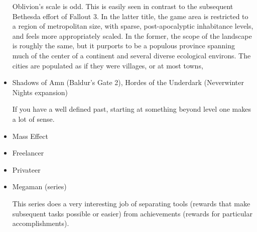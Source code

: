 \begin{itemize}
Oblivion's scale is odd. This is easily seen in contrast to the
subsequent Bethesda effort of Fallout 3. In the latter title, the game
area is restricted to a region of metropolitan size, with sparse,
post-apocalyptic inhabitance levels, and feels more appropriately
scaled. In the former, the scope of the landscape is roughly the same,
but it purports to be a populous province spanning much of the center
of a continent and several diverse ecological environs. The cities are
populated as if they were villages, or at most towns,

\item Shadows of Amn (Baldur's Gate 2), Hordes of the Underdark (Neverwinter Nights expansion)

If you have a well defined past, starting at something beyond level
one makes a lot of sense.

\item Mass Effect

\item Freelancer

\item Privateer

\item Megaman (series)

This series does a very interesting job of separating tools (rewards that make subsequent tasks possible or easier) from achievements (rewards for particular accomplishments).

\end{itemize}


